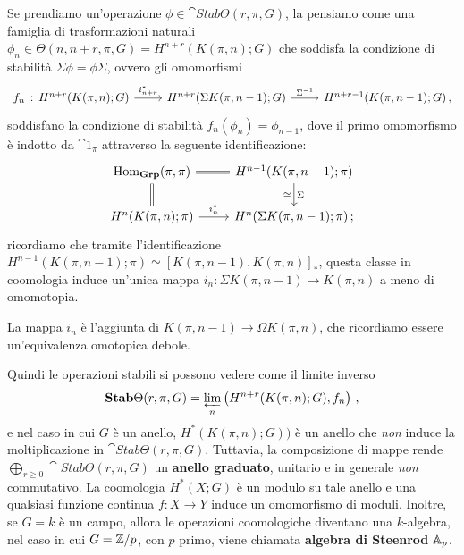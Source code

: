 



Se prendiamo un'operazione $\phi \in \cat{Stab}\Theta(r,\pi,G)$, 
la pensiamo come una famiglia di trasformazioni naturali
$\phi_{n} \in \Theta(n,n+r,\pi,G) = H^{n+r}(K(\pi,n);G)$ che soddisfa la condizione di
stabilità $\Sigma \phi = \phi \Sigma$, ovvero gli omomorfismi
\begin{equation*}
	\begin{tikzcd}
		f_{n} \, : \, H^{n+r}(K(\pi,n);G) \ar[r, "i_{n+r}^{*}"]
		& H^{n+r}(\Sigma K(\pi,n-1);G) \ar[r, "\Sigma^{-1}"]
		& H^{n+r-1}(K(\pi,n-1);G)\,,
	\end{tikzcd}
\end{equation*}
soddisfano la condizione di stabilità $f_{n}(\phi_{n}) = \phi_{n-1}$,
dove il primo omomorfismo è indotto da $\cat{1}_{\pi}$
attraverso la seguente identificazione:
\begin{equation*}
	\begin{tikzcd}
		\Hom_{\cat{Grp}}(\pi,\pi) \ar[r, equals] \ar[d, equals]
		& H^{n-1}(K(\pi,n-1);\pi) \ar[d, "\Sigma", "\simeq"'] \\
		H^{n}(K(\pi,n);\pi) \ar[r,"i^{*}_{n}"]
		& H^{n}(\Sigma K(\pi,n-1);\pi)\,;
	\end{tikzcd}
\end{equation*}
ricordiamo che tramite l'identificazione
$H^{n-1}(K(\pi,n-1);\pi) \simeq [K(\pi,n-1),K(\pi,n)]_{\ast}$,
questa classe in coomologia induce un'unica mappa
$i_{n}:\Sigma K(\pi,n-1) \to K(\pi,n)$ a meno di omomotopia.

\begin{oss}
	La mappa $i_{n}$ è l'aggiunta di $K(\pi,n-1) \to \Omega K(\pi,n)$,
	che ricordiamo essere un'equivalenza omotopica debole.
\end{oss}

Quindi le operazioni stabili si possono vedere come il limite inverso
\begin{equation*}
	\cat{Stab}\Theta(r,\pi,G) = \varprojlim_{n}\left( H^{n+r}(K(\pi,n);G),f_{n}\right)\,,
\end{equation*}
e nel caso in cui $G$ è un anello, $H^{*}(K(\pi,n);G))$ è un anello
che \emph{non} induce la moltiplicazione in $\cat{Stab}\Theta(r,\pi,G)$.
Tuttavia, la composizione di mappe rende  $\bigoplus_{r \ge 0}\cat{Stab}\Theta(r,\pi,G)$
un \textbf{anello graduato}, unitario e in generale \emph{non} commutativo.
La coomologia $H^{*}(X;G)$ è un modulo su tale anello e una
qualsiasi funzione continua $f:X \to Y$ induce un omomorfismo di moduli.
Inoltre, se $G=k$ è un campo, allora le operazioni coomologiche diventano
una $k$-algebra, nel caso in cui $G=\Z/p$, con $p$ primo,
viene chiamata \textbf{algebra di Steenrod} $\AA_{p}$.


